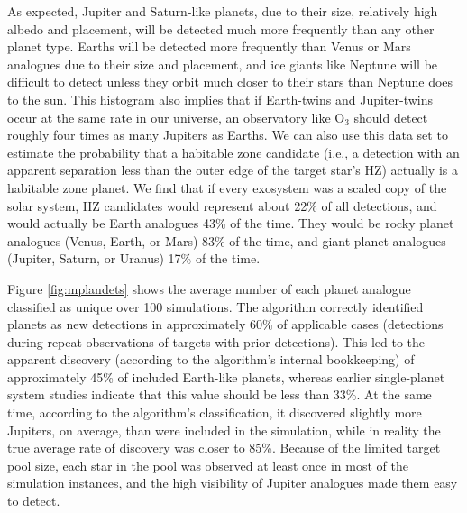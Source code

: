 As expected, Jupiter and Saturn-like planets, due to their size, relatively high albedo and placement, will be detected much more frequently than any other planet type.  Earths will be detected more frequently than Venus or Mars analogues due to their size and placement, and ice giants like Neptune will be difficult to detect unless they orbit much closer to their stars than Neptune does to the sun.  This histogram also implies that if Earth-twins and Jupiter-twins occur at the same rate in our universe, an observatory like O$_3$ should detect roughly four times as many Jupiters as Earths.  We can also use this data set to estimate the probability that a habitable zone candidate (i.e., a detection with an apparent separation less than the outer edge of the target star's HZ) actually is a habitable zone planet.  We find that if every exosystem was a scaled copy of the solar system, HZ candidates would represent about 22\% of all detections, and would actually be Earth analogues 43\% of the time.  They would be rocky planet analogues (Venus, Earth, or Mars) 83\% of the time, and giant planet analogues (Jupiter, Saturn, or Uranus) 17\% of the time.

Figure \ref{fig:mplandets} shows the average number of each planet analogue classified as unique over 100 simulations.  The algorithm correctly identified planets as new detections in approximately 60\% of applicable cases (detections during repeat observations of targets with prior detections).  This led to the apparent discovery (according to the algorithm's internal bookkeeping) of approximately 45\% of included Earth-like planets, whereas earlier single-planet system studies indicate that this value should be less than 33\%.  At the same time, according to the algorithm's classification, it discovered slightly more Jupiters, on average, than were included in the simulation, while in reality the true average rate of discovery was closer to 85\%. Because of the limited target pool size, each star in the  pool was observed at least once in most of the simulation instances, and the high visibility of Jupiter analogues made them easy to detect.  

